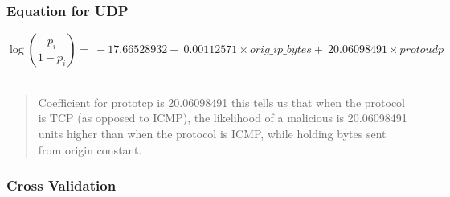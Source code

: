 \documentclass[
]{article}
\begin{document}
\hypertarget{equation-for-udp}{%
\subsubsection{Equation for UDP}\label{equation-for-udp}}

\[
\begin{equation*}
\log\left(\frac{p_i}{1-p_i}\right) = \ -17.66528932 + \ 0.00112571 \times orig\_ip\_bytes + \ 20.06098491 \times protoudp
\end{equation*}
\]\\

\begin{quote}
Coefficient for prototcp is 20.06098491 this tells us that when the
protocol is TCP (as opposed to ICMP), the likelihood of a malicious is
20.06098491 units higher than when the protocol is ICMP, while holding
bytes sent from origin constant.
\end{quote}

\hypertarget{cross-validation}{%
\subsubsection{Cross Validation}\label{cross-validation}}
\end{document}

